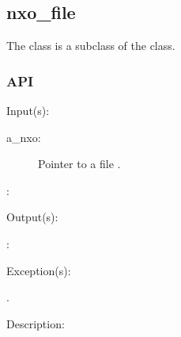 %
%
%
%
%              

\subsection{nxo\_file}
\label{nxo_file}

The  class is a subclass of the  class.

\subsubsection{API}
\begin{capi}
\label{nxo_file_}
	\begin{capilist}
	\item[Input(s): ]
		\begin{description}\item[]
		\item[a\_nxo: ]
			Pointer to a file .
		\item[: ]
		\end{description}
	\item[Output(s): ]
		\begin{description}\item[]
		\item[: ]
		\end{description}
	\item[Exception(s): ]
		\begin{description}\item[]
		\item[.]
		\end{description}
	\item[Description: ]
	\end{capilist}
\end{capi}
